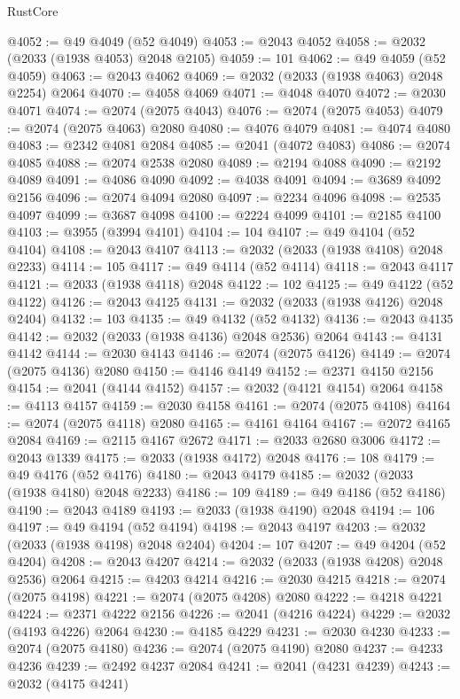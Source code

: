\begin{lexlean}{RustCore}
\begin{coremodule}
@4052 := @49 @4049 (@52 @4049)
@4053 := @2043 @4052
@4058 := @2032 (@2033 (@1938 @4053) @2048 @2105)
@4059 := 101
@4062 := @49 @4059 (@52 @4059)
@4063 := @2043 @4062
@4069 := @2032 (@2033 (@1938 @4063) @2048 @2254) @2064
@4070 := @4058 @4069
@4071 := @4048 @4070
@4072 := @2030 @4071
@4074 := @2074 (@2075 @4043)
@4076 := @2074 (@2075 @4053)
@4079 := @2074 (@2075 @4063) @2080
@4080 := @4076 @4079
@4081 := @4074 @4080
@4083 := @2342 @4081 @2084
@4085 := @2041 (@4072 @4083)
@4086 := @2074 @4085
@4088 := @2074 @2538 @2080
@4089 := @2194 @4088
@4090 := @2192 @4089
@4091 := @4086 @4090
@4092 := @4038 @4091
@4094 := @3689 @4092 @2156
@4096 := @2074 @4094 @2080
@4097 := @2234 @4096
@4098 := @2535 @4097
@4099 := @3687 @4098
@4100 := @2224 @4099
@4101 := @2185 @4100
@4103 := @3955 (@3994 @4101)
@4104 := 104
@4107 := @49 @4104 (@52 @4104)
@4108 := @2043 @4107
@4113 := @2032 (@2033 (@1938 @4108) @2048 @2233)
@4114 := 105
@4117 := @49 @4114 (@52 @4114)
@4118 := @2043 @4117
@4121 := @2033 (@1938 @4118) @2048
@4122 := 102
@4125 := @49 @4122 (@52 @4122)
@4126 := @2043 @4125
@4131 := @2032 (@2033 (@1938 @4126) @2048 @2404)
@4132 := 103
@4135 := @49 @4132 (@52 @4132)
@4136 := @2043 @4135
@4142 := @2032 (@2033 (@1938 @4136) @2048 @2536) @2064
@4143 := @4131 @4142
@4144 := @2030 @4143
@4146 := @2074 (@2075 @4126)
@4149 := @2074 (@2075 @4136) @2080
@4150 := @4146 @4149
@4152 := @2371 @4150 @2156
@4154 := @2041 (@4144 @4152)
@4157 := @2032 (@4121 @4154) @2064
@4158 := @4113 @4157
@4159 := @2030 @4158
@4161 := @2074 (@2075 @4108)
@4164 := @2074 (@2075 @4118) @2080
@4165 := @4161 @4164
@4167 := @2072 @4165 @2084
@4169 := @2115 @4167 @2672
@4171 := @2033 @2680 @3006
@4172 := @2043 @1339
@4175 := @2033 (@1938 @4172) @2048
@4176 := 108
@4179 := @49 @4176 (@52 @4176)
@4180 := @2043 @4179
@4185 := @2032 (@2033 (@1938 @4180) @2048 @2233)
@4186 := 109
@4189 := @49 @4186 (@52 @4186)
@4190 := @2043 @4189
@4193 := @2033 (@1938 @4190) @2048
@4194 := 106
@4197 := @49 @4194 (@52 @4194)
@4198 := @2043 @4197
@4203 := @2032 (@2033 (@1938 @4198) @2048 @2404)
@4204 := 107
@4207 := @49 @4204 (@52 @4204)
@4208 := @2043 @4207
@4214 := @2032 (@2033 (@1938 @4208) @2048 @2536) @2064
@4215 := @4203 @4214
@4216 := @2030 @4215
@4218 := @2074 (@2075 @4198)
@4221 := @2074 (@2075 @4208) @2080
@4222 := @4218 @4221
@4224 := @2371 @4222 @2156
@4226 := @2041 (@4216 @4224)
@4229 := @2032 (@4193 @4226) @2064
@4230 := @4185 @4229
@4231 := @2030 @4230
@4233 := @2074 (@2075 @4180)
@4236 := @2074 (@2075 @4190) @2080
@4237 := @4233 @4236
@4239 := @2492 @4237 @2084
@4241 := @2041 (@4231 @4239)
@4243 := @2032 (@4175 @4241)

\end{coremodule}
\end{lexlean}
